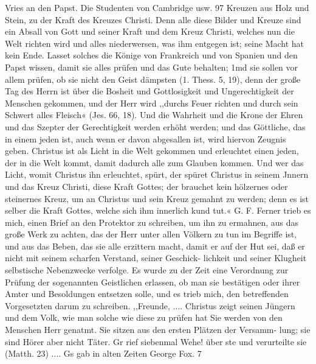 Vries an den Papst. Die Studenten von Cambridge usw. 97
Kreuzen aus Holz und Stein, zu der Kraft des Kreuzes Christi.
Denn alle diese Bilder und Kreuze sind ein Absall von Gott und
seiner Kraft und dem Kreuz Christi, welches nun die Welt richten
wird und alles niederwersen, was ihm entgegen ist; seine Macht
hat kein Ende.
Lasset solches die Könige von Frankreich und von Spanien
und den Papst wissen, damit sie alles prüfen und das Gute behalten;
1md sie sollen vor allem prüfen, ob sie nicht den Geist dämpsten
(1. Thess. 5, 19), denn der große Tag des Herrn ist über die
Bosheit und Gottlosigkeit und Ungerechtigkeit der Menschen
gekommen, und der Herr wird ,,durchs Feuer richten und durch
sein Schwert alles Fleisch« (Jes. 66, 18). Und die Wahrheit
und die Krone der Ehren und das Szepter der Gerechtigkeit
werden erhöht werden; und das Göttliche, das in einem jeden
ist, auch wenn er davon abgesallen ist, wird hiervon Zeugnis
geben. Christus ist als Licht in die Welt gekommen und erleuchtet
einen jeden, der in die Welt kommt, damit dadurch alle zum
Glauben kommen. Und wer das Licht, womit Christus ihn
erleuchtet, spürt, der spüret Christus in seinem Jnnern und das
Kreuz Christi, diese Kraft Gottes; der brauchet kein hölzernes oder
steinernes Kreuz, um an Christus und sein Kreuz gemahnt zu
werden; denn es ist selber die Kraft Gottes, welche sich ihm
innerlich kund tut.« G. F.
Ferner trieb es mich, einen Brief an den Protektor zu
schreiben, um ihn zu ermahnen, aus das große Werk zu achten,
das der Herr unter allen Völkern zu tun im Begriffe ist, und
aus das Beben, das sie alle erzittern macht, damit er auf der
Hut sei, daß er nicht mit seinem scharfen Verstand, seiner Geschick-
lichkeit und seiner Klugheit selbstische Nebenzwecke verfolge.
Es wurde zu der Zeit eine Verordnung zur Prüfung der
sogenannten Geistlichen erlassen, ob man sie bestätigen oder ihrer
Amter und Besoldungen entsetzen solle, und es trieb mich, den
betreffenden Vorgesetzten darum zu schreiben.
,,Freunde,
.... Christus zeigt seinen Jüngern und dem Volk, wie
man solche wie diese zu prüfen hat Sie werden von den Menschen
Herr genatmt. Sie sitzen aus den ersten Plätzen der Versamm-
lung; sie sind Hörer aber nicht Täter. Gr rief siebenmal Wehe!
über ste und verurteilte sie (Matth. 23) .... Gs gab in alten Zeiten
George Fox. 7


